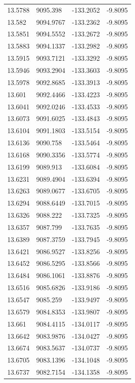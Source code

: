 \begin{table}[H]
\begin{tabular}{llll}
13.5788 & 9095.398 & -133.2052 & -9.8095 \\
13.582 & 9094.9767 & -133.2362 & -9.8095 \\
13.5851 & 9094.5552 & -133.2672 & -9.8095 \\
13.5883 & 9094.1337 & -133.2982 & -9.8095 \\
13.5915 & 9093.7121 & -133.3292 & -9.8095 \\
13.5946 & 9093.2904 & -133.3603 & -9.8095 \\
13.5978 & 9092.8685 & -133.3913 & -9.8095 \\
13.601 & 9092.4466 & -133.4223 & -9.8095 \\
13.6041 & 9092.0246 & -133.4533 & -9.8095 \\
13.6073 & 9091.6025 & -133.4843 & -9.8095 \\
13.6104 & 9091.1803 & -133.5154 & -9.8095 \\
13.6136 & 9090.758 & -133.5464 & -9.8095 \\
13.6168 & 9090.3356 & -133.5774 & -9.8095 \\
13.6199 & 9089.913 & -133.6084 & -9.8095 \\
13.6231 & 9089.4904 & -133.6394 & -9.8095 \\
13.6263 & 9089.0677 & -133.6705 & -9.8095 \\
13.6294 & 9088.6449 & -133.7015 & -9.8095 \\
13.6326 & 9088.222 & -133.7325 & -9.8095 \\
13.6357 & 9087.799 & -133.7635 & -9.8095 \\
13.6389 & 9087.3759 & -133.7945 & -9.8095 \\
13.6421 & 9086.9527 & -133.8256 & -9.8095 \\
13.6452 & 9086.5295 & -133.8566 & -9.8095 \\
13.6484 & 9086.1061 & -133.8876 & -9.8095 \\
13.6516 & 9085.6826 & -133.9186 & -9.8095 \\
13.6547 & 9085.259 & -133.9497 & -9.8095 \\
13.6579 & 9084.8353 & -133.9807 & -9.8095 \\
13.661 & 9084.4115 & -134.0117 & -9.8095 \\
13.6642 & 9083.9876 & -134.0427 & -9.8095 \\
13.6674 & 9083.5637 & -134.0737 & -9.8095 \\
13.6705 & 9083.1396 & -134.1048 & -9.8095 \\
13.6737 & 9082.7154 & -134.1358 & -9.8095 \\

\end{tabular}
\end{table}
